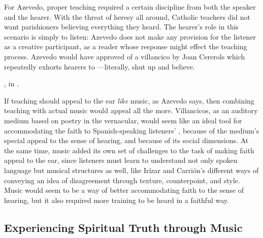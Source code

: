 
For Azevedo, proper teaching required a certain discipline from both the speaker
and the hearer.
With the threat of heresy all around, Catholic teachers did not want
parishioners believing everything they heard.
The hearer's role in this scenario is simply to listen: Azevedo does not make
any provision for the listener as a creative participant, as a reader whose
response might effect the teaching process.
Azevedo would have approved of a villancico by Joan Cererols which repeatedly
exhorts hearers to ---literally, shut up and believe.%
\begin{Footnote}
    , in
    \autocite[205--212]{Cererols:MEM-VC}.
\end{Footnote}


If teaching should appeal to the ear \emph{like} music, as Azevedo says, then
combining teaching with actual music would appeal all the more.
Villancicos, as an auditory medium based on poetry in the vernacular, would seem
like an ideal tool for accommodating the faith to Spanish-speaking listeners'
, because of the medium's special appeal to the
sense of hearing, and because of its social dimensions.
At the same time, music added its own set of challenges to the task of making
faith appeal to the ear, since listeners must learn to understand not only
spoken language but musical structures as well, like Irízar and Carrión's
different ways of conveying an idea of disagreement through texture,
counterpoint, and style.
Music would seem to be a way of better accommodating faith to the sense of
hearing, but it also required more training to be heard in a faithful way.


\subsection{Experiencing Spiritual Truth through Music}

